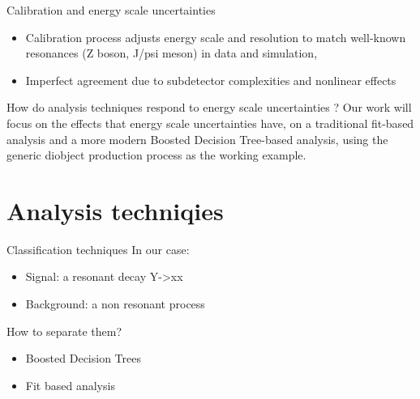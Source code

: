 \documentclass[bigger]{beamer}
\begin{document}
\begin{frame}[label={sec:org39c61b0}]{Calibration and energy scale uncertainties}
\begin{itemize}
\item Calibration process adjusts energy scale and resolution to match well-known resonances (Z boson, J/psi meson) in data and simulation,
\end{itemize}
\begin{itemize}
\item Imperfect agreement due to subdetector complexities and nonlinear effects
\end{itemize}
\begin{block}{How do analysis techniques respond to energy scale uncertainties ?}
Our work will focus on the effects that energy scale uncertainties have, on a traditional fit-based analysis and a more modern Boosted Decision Tree-based analysis, using the generic diobject production process as the working example.
\end{block}
\end{frame}
\section{Analysis techniqies}
\label{sec:orga02cf62}
\begin{frame}[label={sec:org8b38a66}]{Classification techniques}
\alert{In our case}:
\begin{itemize}
\item Signal: a resonant decay Y->xx
\item Background: a non resonant process
\end{itemize}
\alert{How to separate them?}
\begin{itemize}
\item Boosted Decision Trees
\item Fit based analysis
\end{itemize}
\end{frame}
\end{document}

